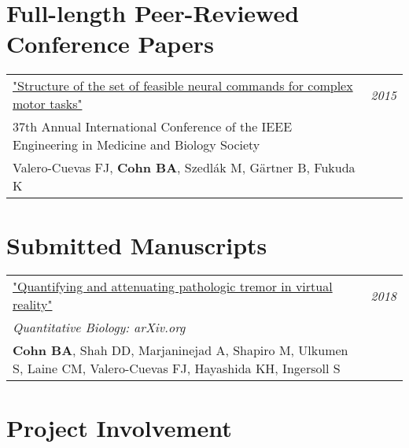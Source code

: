 \documentclass[10pt,a4paper]{article}
\begin{document}
\vspace*{3mm}\section*{Full-length Peer-Reviewed Conference Papers} 

\vspace*{1mm}\noindent\begin{tabularx}{17cm}{X r}
    \href{https://github.com/bc/resume/raw/master/papers/valero_cuevas_et_al_2015_ieee_embs.pdf}{"Structure of the set of feasible neural commands for complex motor tasks" } & \textit{2015}\\
    37th Annual International Conference of the IEEE Engineering in Medicine and Biology Society \\
    Valero-Cuevas FJ, \textbf{Cohn BA}, Szedl\'{a}k M, G{\"a}rtner B, Fukuda K \\[2mm]
\end{tabularx}


\vspace*{3mm}\section*{Submitted Manuscripts} 

\vspace*{1mm}\noindent\begin{tabularx}{17cm}{X r}
  \href{https://arxiv.org/pdf/1809.05970.pdf}{"Quantifying and attenuating pathologic tremor in virtual reality"} & \textit{2018} \\ %
  \textit{Quantitative Biology: arXiv.org} \\
  \textbf{Cohn BA}, Shah DD, Marjaninejad A, Shapiro M, Ulkumen S, Laine CM, Valero-Cuevas FJ, Hayashida KH, Ingersoll S \\[2mm]
\end{tabularx}


\vspace*{3mm}\section*{Project Involvement}
\end{document}

